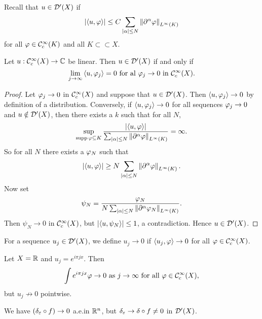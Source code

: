 Recall that $u\in\mathcal{D}'(X)$ if
\[ \left\lvert {\left\langle u,\varphi\right\rangle} \right\rvert \leq C \sum_{\left\lvert \alpha \right\rvert\leq N} \left\lVert \partial^\alpha\varphi \right\rVert_{L^\infty(K)} \]
for all $\varphi\in\mathcal{C}_c^\infty(K)$ and all $K \subset\subset X$.

\begin{thm}
  Let $u: \mathcal{C}_c^\infty(X) \to \mathbb{C}$ be linear.
  Then $u\in\mathcal{D}'(X)$ if and only if
  \[ \lim_{j\to\infty}{\left\langle u,\varphi_j \right\rangle}=0 \text{ for al } \varphi_j\to0 \text{ in } \mathcal{C}_c^\infty(X). \]
\end{thm}

\begin{proof}
  Let $\varphi_j\to0$ in $\mathcal{C}_c^\infty(X)$ and suppose that $u\in\mathcal{D}'(X)$.
  Then ${\left\langle u,\varphi_j \right\rangle}\to0$ by definition of a distribution.
  Conversely, if ${\left\langle u,\varphi_j \right\rangle}\to0$ for all sequences $\varphi_j\to0$ and $u\notin\mathcal{D}'(X)$, then there exists a $k$ such that for all $N$,
  \[ \sup_{\operatorname{supp}\varphi\subseteq K} \frac{\left\lvert {\left\langle u,\varphi\right\rangle} \right\rvert}{\sum_{\left\lvert \alpha \right\rvert\leq N} \left\lVert \partial^\alpha\varphi \right\rVert_{L^\infty(K)}} = \infty. \]
  So for all $N$ there exists a $\varphi_N$ such that
  \[ \left\lvert {\left\langle u,\varphi\right\rangle} \right\rvert \geq N \sum_{\left\lvert \alpha \right\rvert\leq N} \left\lVert \partial^\alpha\varphi \right\rVert_{L^\infty(K)}. \]
  Now set
  \[ \psi_N = \frac{\varphi_N}{N\sum_{\left\lvert \alpha \right\rvert\leq N} \left\lVert \partial^\alpha\varphi_N \right\rVert_{L^\infty(K)}}. \]
  Then $\psi_N\to0$ in $\mathcal{C}_c^\infty(X)$, but $\left\lvert {\left\langle u,\psi_N \right\rangle} \right\rvert\leq1$, a contradiction.
  Hence $u\in\mathcal{D}'(X)$.
\end{proof}

\begin{defn}
  For a sequence $u_j\in\mathcal{D}'(X)$, we define $u_j\to0$ if ${\left\langle u_j,\varphi \right\rangle}\to0$ for all $\varphi\in\mathcal{C}_c^\infty(X)$.  
\end{defn}

\begin{exam}
  \lv
  \begin{enum}
    \io Let $X=\mathbb{R}$ and $u_j=e^{i\pi jx}$.
      Then
      \[ \int e^{i\pi jx}\varphi \to 0 \text{ as } j\to\infty \text{ for all } \varphi\in\mathcal{C}_c^\infty(X), \]
      but $u_j\not\to0$ pointwise.

      \io We have $(\delta_\varepsilon\circ f)\to0$ a.e.\@ in $\mathbb{R}^n$, but $\delta_\varepsilon\to\delta\circ f\neq0$ in $\mathcal{D}'(X)$.
  \end{enum}
\end{exam}
